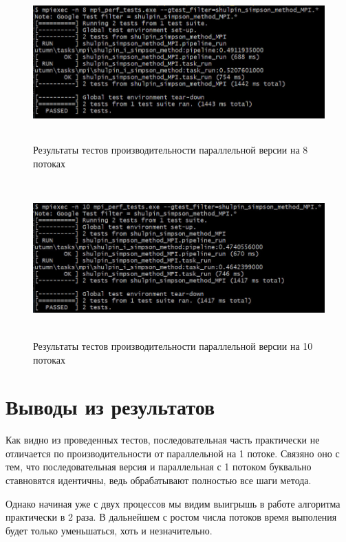 \documentclass[12pt,a4paper]{article}
\begin{document}
\begin{figure}[H]
\centering
\includegraphics[height=6cm]{img/8nmpiperftest.jpg}
\caption{\label{fig:visualClass} Результаты тестов производительности параллельной версии на 8 потоках}
\end{figure}

\begin{figure}[H]
\centering
\includegraphics[height=6cm]{img/10nmpiperftest.jpg}
\caption{\label{fig:visualClass} Результаты тестов производительности параллельной версии на 10 потоках}
\end{figure}

\section*{Выводы из результатов}

Как видно из проведенных тестов, последовательная часть практически не отличается по производительности от параллельной на 1 потоке. Связяно оно с тем, что последовательная версия и параллельная с 1 потоком буквально ставновятся идентичны, ведь обрабатывают полностью все шаги метода.

Однако начиная уже с двух процессов мы видим выигрышь в работе алгоритма практически в 2 раза. В дальнейшем с ростом числа потоков время выполения будет только уменьшаться, хоть и незначительно.
\end{document}
